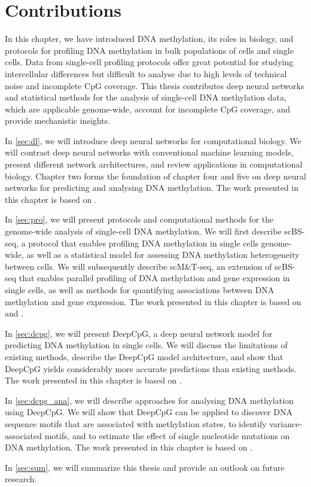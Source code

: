 \section{Contributions} \label{sec:intro_contrib}

In this chapter, we have introduced DNA methylation, its roles in biology, and protocols for profiling DNA methylation in bulk populations of cells and single cells. Data from single-cell profiling protocols offer great potential for studying intercellular differences but difficult to analyse due to high levels of technical noise and incomplete CpG coverage. This thesis contributes deep neural networks and statistical methods for the analysis of single-cell DNA methylation data, which are applicable genome-wide, account for incomplete CpG coverage, and provide mechanistic insights.

In \cref{sec:dl}, we will introduce deep neural networks for computational biology. We will contrast deep neural networks with conventional machine learning models, present different network architectures, and review applications in computational biology. Chapter two forms the foundation of chapter four and five on deep neural networks for predicting and analysing DNA methylation. The work presented in this chapter is based on \citet{angermueller_deep_2016}.

In \cref{sec:pro}, we will present protocols and computational methods for the genome-wide analysis of single-cell DNA methylation. We will first describe scBS-seq, a protocol that enables profiling DNA methylation in single cells genome-wide, as well as a statistical model for assessing DNA methylation heterogeneity between cells. We will subsequently describe scM\&T-seq, an extension of scBS-seq that enables parallel profiling of DNA methylation and gene expression in single cells, as well as methods for quantifying associations between DNA methylation and gene expression. The work presented in this chapter is based on \citet{smallwood_single-cell_2014} and \citet{angermueller_parallel_2016}.

In \cref{sec:dcpg}, we will present DeepCpG, a deep neural network model for predicting DNA methylation in single cells. We will discuss the limitations of existing methods, describe the DeepCpG model architecture, and show that DeepCpG yields considerably more accurate predictions than existing methods. The work presented in this chapter is based on \citet{angermueller_accurate_2017}.

In \cref{sec:dcpg_ana}, we will describe approaches for analysing DNA methylation using DeepCpG. We will show that DeepCpG can be applied to discover DNA sequence motifs that are associated with methylation states, to identify variance-associated motifs, and to estimate the effect of single nucleotide mutations on DNA methylation. The work presented in this chapter is based on \citet{angermueller_accurate_2017}.

In \cref{sec:sum}, we will summarize this thesis and provide an outlook on future research.
